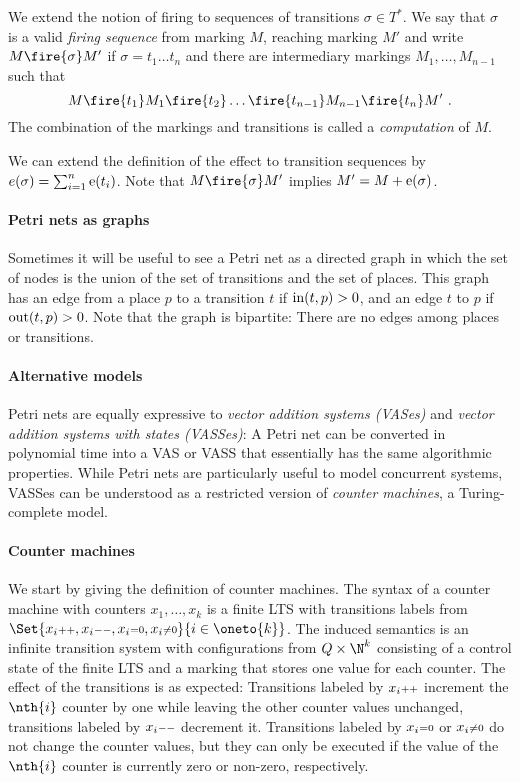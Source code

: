\documentclass[../../diss.tex]{subfiles}
\begin{document}
We extend the notion of firing to sequences of transitions $\sigma \in T^*$.
We say that $\sigma$ is a valid \emph{firing sequence} from marking $M$, reaching marking $M'$ and write $M \fire{\sigma} M'$ if $\sigma = t_1 \ldots t_n$ and there are intermediary markings $M_1, \ldots, M_{n-1}$ such that
\[
    M \fire{t_1} M_1 \fire{t_2} \ldots \fire{t_{n-1}} M_{n-1} \fire{t_n} M'
    \ .
\]
The combination of the markings and transitions is called a \emph{computation} of $M$.

We can extend the definition of the effect to transition sequences by $e(\sigma) = \sum_{i = 1}^n \text{e}(t_i)$.
Note that $M \fire{\sigma} M'$ implies $M' = M + \text{e}(\sigma)$.

\paragraph{Petri nets as graphs}

Sometimes it will be useful to see a Petri net as a directed graph in which the set of nodes is the union of the set of transitions and the set of places.
This graph has an edge from a place $p$ to a transition $t$ if $\text{in}(t,p) > 0$, and an edge $t$ to $p$ if $\text{out}(t,p) > 0$.
Note that the graph is bipartite: There are no edges among places or transitions.

\paragraph{Alternative models}

Petri nets are equally expressive to \emph{vector addition systems (VASes)} and \emph{vector addition systems with states (VASSes)}:
A Petri net can be converted in polynomial time into a VAS or VASS that essentially has the same algorithmic properties.
While Petri nets are particularly useful to model concurrent systems, VASSes can be understood as a restricted version of \emph{counter machines}, a Turing-complete model.

\paragraph{Counter machines}

We start by giving the definition of counter machines.
The syntax of a counter machine with counters $x_1, \ldots, x_k$ is a finite LTS with transitions labels from $\Set{ \incop{x_i}, \decop{x_i}, \zeroop{x_i}, \nonzeroop{x_i}}{i \in \oneto{k}}$.
The induced semantics is an infinite transition system with configurations from $Q \times \N^k$ consisting of a control state of the finite LTS and a marking that stores one value for each counter.
The effect of the transitions is as expected: Transitions labeled by $x_i{\scriptstyle++}$ increment the $\nth{i}$ counter by one while leaving the other counter values unchanged, transitions labeled by $x_i{\scriptstyle--}$ decrement it.
Transitions labeled by $x_i{\scriptstyle=0}$ or $x_i{\scriptstyle\neq0}$ do not change the counter values, but they can only be executed if the value of the $\nth{i}$ counter is currently zero or non-zero, respectively.
\end{document}
